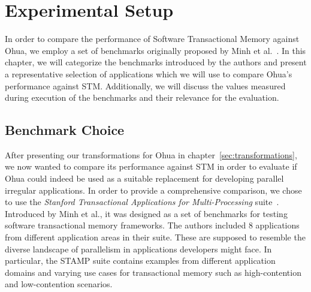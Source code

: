 %
\chapter{Experimental Setup}%
\label{sec:experiments}

In order to compare the performance of Software Transactional Memory against Ohua, we employ a set of benchmarks originally proposed by Minh et al.~\cite{minh2008stamp}.
In this chapter, we will categorize the benchmarks introduced by the authors and present a representative selection of applications which we will use to compare Ohua's performance against STM.
Additionally, we will discuss the values measured during execution of the benchmarks and their relevance for the evaluation.

\section{Benchmark Choice}

After presenting our transformations for Ohua in chapter~\ref{sec:transformations}, we now wanted to compare its performance against STM in order to evaluate if Ohua could indeed be used as a suitable replacement for developing parallel irregular applications.
In order to provide a comprehensive comparison, we chose to use the \emph{Stanford Transactional Applications for Multi-Processing} suite~\cite{minh2008stamp}.
Introduced by Minh et al., it was designed as a set of benchmarks for testing software transactional memory frameworks.
The authors included 8 applications from different application areas in their suite.
These are supposed to resemble the diverse landscape of parallelism in applications developers might face.
In particular, the STAMP suite contains examples from different application domains and varying use cases for transactional memory such as high-contention and low-contention scenarios.

